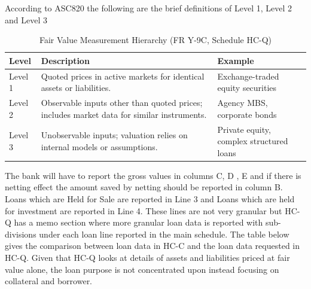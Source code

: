 \documentclass[conference]{IEEEtran}
\begin{document}
	According to ASC820 the following are the brief definitions of Level 1, Level 2 and Level 3
	\begin{table}[htbp]
		\centering
		\caption{Fair Value Measurement Hierarchy (FR Y-9C, Schedule HC-Q)}
		\begin{tabular}{|p{1.5cm}|p{2cm}|p{2.5cm}|}
			\hline
			\textbf{Level} & \textbf{Description} & \textbf{Example} \\
			\hline
			Level 1 & Quoted prices in active markets for identical assets or liabilities. & Exchange-traded equity securities \\
			\hline
			Level 2 & Observable inputs other than quoted prices; includes market data for similar instruments. & Agency MBS, corporate bonds \\
			\hline
			Level 3 & Unobservable inputs; valuation relies on internal models or assumptions. & Private equity, complex structured loans \\
			\hline
		\end{tabular}
	\end{table}
	
	The bank will have to report the gross values in columns C, D , E and if there is netting effect the amount saved by netting should be reported in column B. 
	Loans which are Held for Sale are reported in Line 3 and Loans which are held for investment are reported in Line 4. These lines are not very granular but HC-Q has a memo section where more granular loan data is reported with sub-divisions under each loan line reported in the main schedule. The table below gives the comparison between loan data in HC-C and the loan data requested in HC-Q. Given that HC-Q looks at details of assets and liabilities priced at fair value alone, the loan purpose is not concentrated upon instead focusing on collateral and borrower.
	
\end{document}
